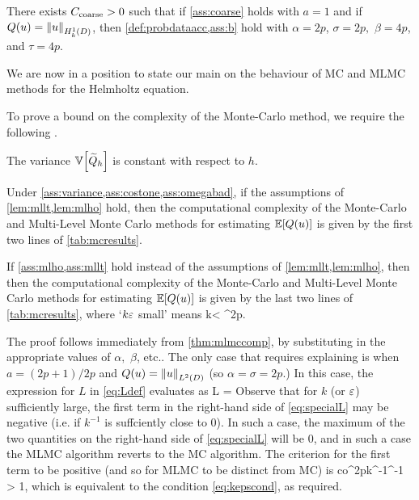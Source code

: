 \bas[Assumptions for $Q(u) = \NLtD{u}$ with $a=1$]\label{ass:mllt}
There exists $C_{\mathrm{coarse}}>0$ such that if \cref{ass:coarse} holds with $a = 1$ and if $Q(u) = \NHokD{u}$, then \cref{def:probdataacc,ass:b} hold with $\alpha = 2p$, $\sigma = 2p,$ $\beta = 4p$, and $\tau = 4p$.
\eas

We are now in a position to state our main  on the behaviour of MC and MLMC methods for the Helmholtz equation.

To prove a bound on the complexity of the Monte-Carlo method, we require the following .

The variance $\VAR{\Qhtilde}$ is constant with respect to $h$.
\eas

Under \cref{ass:variance,ass:costone,ass:omegabad}, if the assumptions of \cref{lem:mllt,lem:mlho} hold, then the computational complexity of the Monte-Carlo and Multi-Level Monte Carlo methods for estimating $\EXP{Q(u)}$ is given by the first two lines of \cref{tab:mcresults}.

If \cref{ass:mlho,ass:mllt} hold instead of the assumptions of \cref{lem:mllt,lem:mlho}, then then the computational complexity of the Monte-Carlo and Multi-Level Monte Carlo methods for estimating $\EXP{Q(u)}$ is given by the last two lines of \cref{tab:mcresults}, where `$k\varepsilon$ small' means
\beq\label{eq:kepscond}
k\eps < \co \Ccoarse^{2p}.
\eeq
\enth

The proof follows immediately from \cref{thm:mlmccomp}, by substituting in the appropriate values of $\alpha,$ $\beta$, etc.. The only case that requires explaining is when $a=(2p+1)/2p$ and $Q(u) = \NLtD{u}$ (so $\alpha = \sigma = 2p.$) In this case, the expression for $L$ in \cref{eq:Ldef} evaluates as
\beq\label{eq:specialL}
L = \max{}
\eeq
Observe that for $k$ (or $\varepsilon$) sufficiently large, the first term in the right-hand side of \cref{eq:specialL} may be negative (i.e. if $k^{-1}$ is suffciently close to 0). In such a case, the maximum of the two quantities on the right-hand side of \cref{eq:specialL} will be 0, and in such a case the MLMC algorithm reverts to the MC algorithm. The criterion for the first term to be positive (and so for MLMC to be distinct from MC) is
\beqs
{}co\Ccoarse^{2p}k^{-1}\eps^{-1} > 1,
\eeqs
which is equivalent to the condition \cref{eq:kepscond}, as required.
\epf
{}
